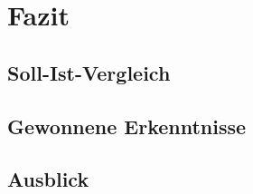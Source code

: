 \newpage
\section{Fazit}
\label{fazit}

\subsection{Soll-Ist-Vergleich}
\label{sollIstVgl}

\subsection{Gewonnene Erkenntnisse}
\label{erkenntnisse}

\subsection{Ausblick}
\label{ausblick}